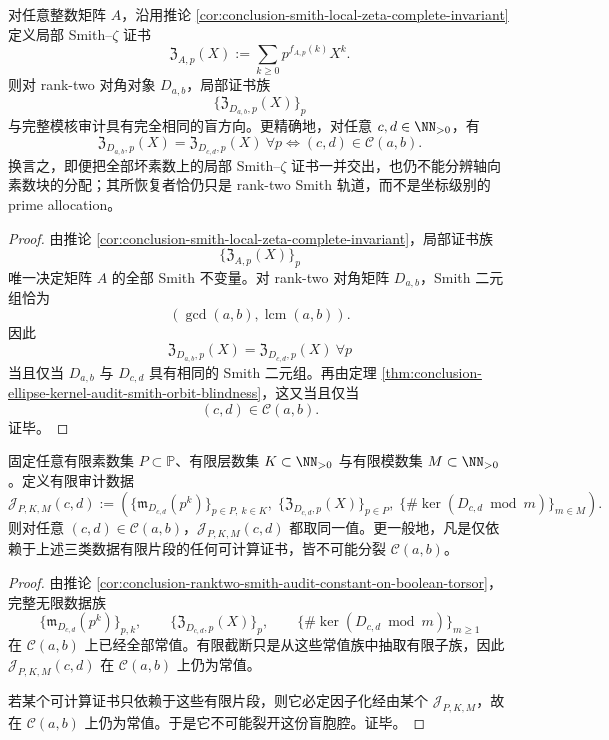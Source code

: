 \begin{corollary}\label{cor:conclusion-local-smith-zeta-same-blindness-as-complete-audit}
对任意整数矩阵 \(A\)，沿用推论 \ref{cor:conclusion-smith-local-zeta-complete-invariant} 定义局部 Smith--\(\zeta\) 证书
\[
\mathfrak Z_{A,p}(X):=\sum_{k\ge 0}p^{f_{A,p}(k)}X^k.
\]
则对 rank-two 对角对象 \(D_{a,b}\)，局部证书族
\[
\{\mathfrak Z_{D_{a,b},p}(X)\}_{p}
\]
与完整模核审计具有完全相同的盲方向。更精确地，对任意 \(c,d\in\NN_{>0}\)，有
\[
\boxed{\;
\mathfrak Z_{D_{a,b},p}(X)=\mathfrak Z_{D_{c,d},p}(X)\ \forall p
\iff
(c,d)\in\mathcal C(a,b).\;}
\]
换言之，即便把全部坏素数上的局部 Smith--\(\zeta\) 证书一并交出，也仍不能分辨轴向素数块的分配；其所恢复者恰仍只是 rank-two Smith 轨道，而不是坐标级别的 prime allocation。
\end{corollary}
\begin{proof}
由推论 \ref{cor:conclusion-smith-local-zeta-complete-invariant}，局部证书族
\[
\{\mathfrak Z_{A,p}(X)\}_{p}
\]
唯一决定矩阵 \(A\) 的全部 Smith 不变量。对 rank-two 对角矩阵 \(D_{a,b}\)，Smith 二元组恰为
\[
(\gcd(a,b),\operatorname{lcm}(a,b)).
\]
因此
\[
\mathfrak Z_{D_{a,b},p}(X)=\mathfrak Z_{D_{c,d},p}(X)\ \forall p
\]
当且仅当 \(D_{a,b}\) 与 \(D_{c,d}\) 具有相同的 Smith 二元组。再由定理 \ref{thm:conclusion-ellipse-kernel-audit-smith-orbit-blindness}，这又当且仅当
\[
(c,d)\in\mathcal C(a,b).
\]
证毕。
\end{proof}

\begin{theorem}\label{thm:conclusion-ranktwo-finite-truncation-cannot-split-boolean-blindcavity}
固定任意有限素数集 \(P\subset\mathbb P\)、有限层数集 \(K\subset \NN_{>0}\) 与有限模数集 \(M\subset \NN_{>0}\)。定义有限审计数据
\[
\mathcal J_{P,K,M}(c,d)
:=
\left(
\{\mathfrak m_{D_{c,d}}(p^k)\}_{p\in P,\ k\in K},
\;
\{\mathfrak Z_{D_{c,d},p}(X)\}_{p\in P},
\;
\{\#\ker(D_{c,d}\bmod m)\}_{m\in M}
\right).
\]
则对任意 \((c,d)\in \mathcal C(a,b)\)，\(\mathcal J_{P,K,M}(c,d)\) 都取同一值。更一般地，凡是仅依赖于上述三类数据有限片段的任何可计算证书，皆不可能分裂 \(\mathcal C(a,b)\)。
\end{theorem}
\begin{proof}
由推论 \ref{cor:conclusion-ranktwo-smith-audit-constant-on-boolean-torsor}，完整无限数据族
\[
\{\mathfrak m_{D_{c,d}}(p^k)\}_{p,k},
\qquad
\{\mathfrak Z_{D_{c,d},p}(X)\}_{p},
\qquad
\{\#\ker(D_{c,d}\bmod m)\}_{m\ge 1}
\]
在 \(\mathcal C(a,b)\) 上已经全部常值。有限截断只是从这些常值族中抽取有限子族，因此 \(\mathcal J_{P,K,M}(c,d)\) 在 \(\mathcal C(a,b)\) 上仍为常值。

若某个可计算证书只依赖于这些有限片段，则它必定因子化经由某个 \(\mathcal J_{P,K,M}\)，故在 \(\mathcal C(a,b)\) 上仍为常值。于是它不可能裂开这份盲胞腔。证毕。
\end{proof}

